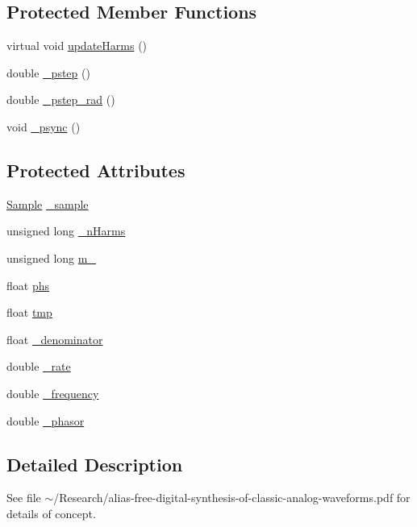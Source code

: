 \subsection*{Protected Member Functions}
\begin{DoxyCompactItemize}
\item 
virtual void \hyperlink{classDSG_1_1BLIT_ac59980dee201683229d5a106f941298b}{update\+Harms} ()
\item 
double \hyperlink{classDSG_1_1SignalGenerator_ac0d781b8673b3a283bf7c133290ede50}{\+\_\+pstep} ()
\item 
double \hyperlink{classDSG_1_1SignalGenerator_ae660eb4caa88b8d278f8d24d0908a487}{\+\_\+pstep\+\_\+rad} ()
\item 
void \hyperlink{classDSG_1_1SignalGenerator_a05baccb38d1e52860d4fcf7cb8430efc}{\+\_\+psync} ()
\end{DoxyCompactItemize}
\subsection*{Protected Attributes}
\begin{DoxyCompactItemize}
\item 
\hyperlink{classDSG_1_1Sample}{Sample} \hyperlink{classDSG_1_1BLIT_a4fa5d5d8a8d5dd64e027067d0018570d}{\+\_\+sample}
\item 
unsigned long \hyperlink{classDSG_1_1BLIT_afe749d26f1503740bedd54f5147bc66d}{\+\_\+n\+Harms}
\item 
unsigned long \hyperlink{classDSG_1_1BLIT_a93504a847d83314bbd9020750820242b}{m\+\_\+}
\item 
float \hyperlink{classDSG_1_1BLIT_a392dc88ed2691c6637a6afe8607881c6}{phs}
\item 
float \hyperlink{classDSG_1_1BLIT_ac0570d5d963ca947e8860a547df7b9dc}{tmp}
\item 
float \hyperlink{classDSG_1_1BLIT_a664b4f06a7b5657261cfaa30dd503c16}{\+\_\+denominator}
\item 
double \hyperlink{classDSG_1_1SignalGenerator_aa10f6c85d9adee901139ea7fb346f39d}{\+\_\+rate}
\item 
double \hyperlink{classDSG_1_1SignalGenerator_a67e296e3506dcdf09402c667cddff9ac}{\+\_\+frequency}
\item 
double \hyperlink{classDSG_1_1SignalGenerator_ac2271b582bf699275f077ecb642a8cd9}{\+\_\+phasor}
\end{DoxyCompactItemize}


\subsection{Detailed Description}
See file $\sim$/\+Research/alias-\/free-\/digital-\/synthesis-\/of-\/classic-\/analog-\/waveforms.pdf for details of concept. 

